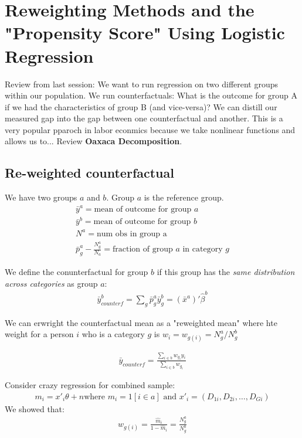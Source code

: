 \documentclass[10pt,a4paper, oneside]{book}
\begin{document}
\chapter{Reweighting Methods and the "Propensity Score" Using Logistic Regression}
Review from last session: We want to run regression on two different groups within our population. We run counterfactuals: What is the outcome for group A if we had the characteristics of group B (and vice-versa)? We can distill our measured gap into the gap between one counterfactual and another. This is a very popular pparoch in labor econmics because we take nonlinear functions and allows us to... Review \textbf{Oaxaca Decomposition}.

\section{Re-weighted counterfactual}
We have two groups $a$ and $b$. Group $a$ is the reference group.
\begin{align*}
    \bar{y}^a = \text{mean of outcome for group $a$} \\
    \bar{y}^b = \text{mean of outcome for group $b$} \\
    N^a = \text{num obs in group a} \\
    \bar{p}_g^a - \frac{N^a_g}{N_a} = \text{fraction of group $a$ in category $g$}
\end{align*}
 
We define the conunterfactual for group $b$ if this group has the \textit{same distribution across categories} as group $a$:
\begin{align*}
    \bar{y}^b_{counter f} = \sum_g{\bar{p}^a_g \bar{y}^b_g} = (\bar{x}^a)'\hat{\beta}^b
\end{align*}

We can erwright the counterfactual mean as a "reweighted mean" where hte weight for a person $i$ who is a category $g$ is $w_i = w_{g(i)} = N^a_g / N^b_g$

\begin{align*}
    \bar{y}_{counter f} = \frac{\sum_{i \in b}w_{g_i}y_i}{\sum_{i \in b}w_{g_i}}
\end{align*}

Consider crazy regression for combined sample:
\begin{align*}
    m_i = x'_i\theta + n \text{where $m_i = 1[i \in a]$ and $x'_i = (D_{1i}, D_{2i}, \dots, D_{Gi})$}
\end{align*}
We showed that:
\begin{align*}
    w_{g(i)} = \frac{\hat{m}_i}{1-\hat{m}_i} = \frac{N^a_g}{N^b_g}
\end{align*}
\end{document}
